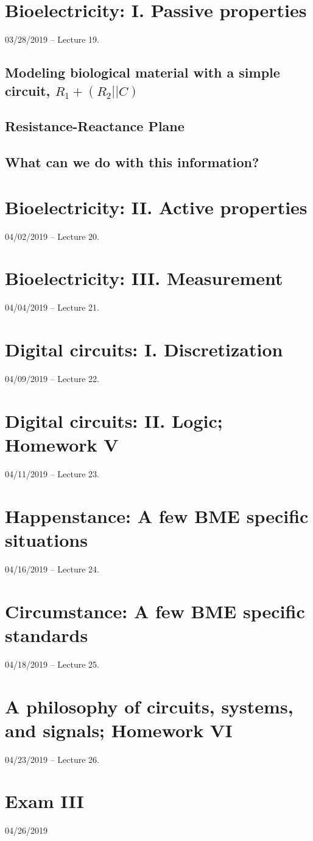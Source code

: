 \documentclass[11pt]{book}
\begin{document}
\chapter{Bioelectricity: I. Passive properties}
03/28/2019 – Lecture 19. 
\section{Modeling biological material with a simple circuit, $R_1 + (R_2||C)$}
\section{Resistance-Reactance Plane}
\section{What can we do with this information?}



\chapter{Bioelectricity: II. Active properties}
04/02/2019 – Lecture 20. 



\chapter{Bioelectricity: III. Measurement}
04/04/2019 – Lecture 21. 



\chapter{Digital circuits: I. Discretization}
04/09/2019 – Lecture 22. 



\chapter{Digital circuits: II. Logic; Homework V}
04/11/2019 – Lecture 23. 



\chapter{Happenstance: A few BME specific situations}
04/16/2019 – Lecture 24. 



\chapter{Circumstance: A few BME specific standards}
04/18/2019 – Lecture 25. 



\chapter{A philosophy of circuits, systems, and signals; Homework VI}
04/23/2019 – Lecture 26. 



\chapter*{Exam III}
04/26/2019 
\end{document}
